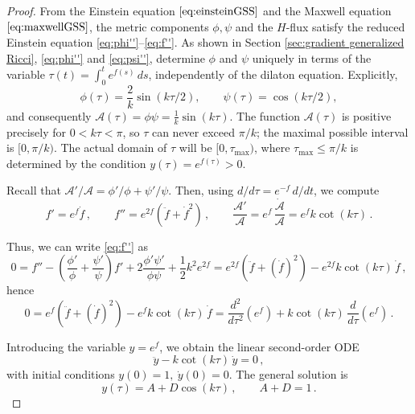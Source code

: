\documentclass[10pt,a4paper]{amsart}
\newcommand{\cA}{\mathcal{A}}
\begin{document}
\begin{proof}
From the Einstein equation $\eqref{eq:einsteinGSS}$ and the Maxwell equation $\eqref{eq:maxwellGSS}$, the metric components $\phi,\psi$ and the $H$-flux satisfy the reduced Einstein equation \eqref{eq:phi''}–\eqref{eq:f''}. As shown in Section \ref{sec:gradient generalized Ricci}, \eqref{eq:phi''} and \eqref{eq:psi''}, determine $\phi$ and $\psi$ uniquely in terms of the variable $\tau(t) = \int_0^t e^{f(s)} \,ds$, independently of the dilaton equation. Explicitly,
\begin{equation*}
\phi(\tau) = \frac{2}{k}\sin(k\tau/2),\qquad \psi(\tau) = \cos(k\tau/2),
\end{equation*}
and consequently $\cA(\tau) = \phi\psi = \frac{1}{k}\sin(k\tau)$. The function $\cA(\tau)$ is positive precisely for $0 < k\tau < \pi$, so $\tau$ can never exceed $\pi/k$; the maximal possible interval is $[0,\pi/k)$. The actual domain of $\tau$ will be $[0,\tau_{\max})$, where $\tau_{\max} \le \pi/k$ is determined by the condition $y(\tau) = e^{f(\tau)} > 0$.

Recall that $\cA'/\cA=\phi'/\phi+\psi'/\psi$. Then, using $d/d\tau=e^{-f}\,d/dt$, we compute
\begin{equation*}
f' = e^f\dot{f} \,, \qquad f'' = e^{2f}(\ddot f + \dot{f}^2) \,, \qquad \frac{\cA'}{\cA} = e^f \,\frac{\dot{\cA}}{\cA} = e^f k\cot(k\tau) \,.
\end{equation*}

Thus, we can write \eqref{eq:f''} as
\begin{equation*}
0 = f'' - \left(\frac{\phi'}{\phi} + \frac{\psi'}{\psi}\right) f' + 2\frac{\phi'\psi'}{\phi\psi} + \frac{1}{2}k^2 e^{2f} = e^{2f}(\ddot{f} + (\dot{f})^2) - e^{2f} k\cot(k\tau) \,\dot{f} \,,
\end{equation*}
hence
\begin{equation*}
0 = e^f(\ddot{f} + (\dot{f})^2) - e^f k\cot(k\tau) \,\dot{f} = \frac{d^2}{d\tau^2}(e^f) + k\cot(k\tau) \,\frac{d}{d\tau}(e^f) \,.
\end{equation*}

Introducing the variable $y=e^f$, we obtain the linear second-order ODE
\begin{equation*}
\ddot{y} - k\cot(k\tau)\,\dot{y} = 0 \,,
\end{equation*}
with initial conditions $y(0)=1,\ \dot{y}(0)=0$. The general solution is
\begin{equation}\label{eq:ysolution}
y(\tau) = A + D\cos(k\tau) \,, \qquad A+D=1 \,.
\end{equation}


\end{proof}
\end{document}
